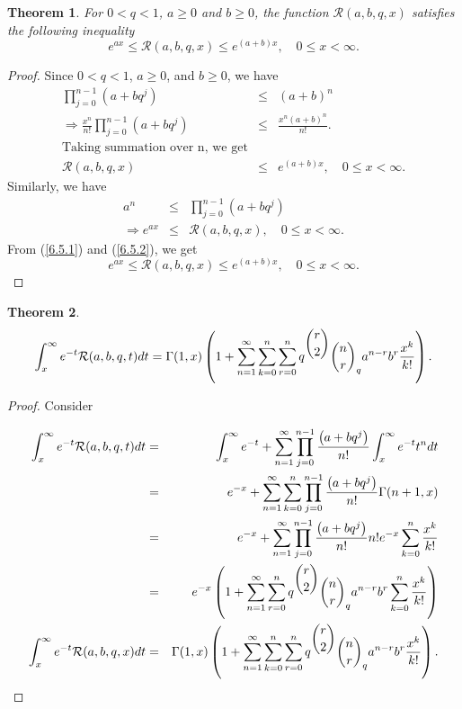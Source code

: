 \documentclass[12pt]{article}
\newtheorem{The}{Theorem}[section]
\numberwithin{equation}{section}
\begin{document}
\begin{The}
For $0<q<1$, $a\ge 0$ and  $b\ge 0$, the function $\mathcal{R}(a,b,q,x)$ satisfies the following inequality
\begin{equation}
 e^{ax}\le \mathcal{R}(a,b,q,x)\le e^{(a+b)x},\quad 0 \le x < \infty.
\end{equation}
\end{The}

\begin{proof}
 Since $0<q<1$, $a\ge 0$, and  $b\ge 0$, we have
\begin{eqnarray}
\prod_{j=0}^{n-1}\left(a+bq^j\right) &\le& (a+b)^n \nonumber\\
\Rightarrow  \frac{x^n}{n!}\prod_{j=0}^{n-1}\left(a+bq^j\right) &\le&  \frac{x^n (a+b)^n}{n!}.\nonumber\\
\textrm{Taking summation over n, we get} \nonumber\\
 \mathcal{R}(a,b,q,x) &\le& e^{(a+b)x},\quad 0 \le x < \infty.\label{6.5.1}
\end{eqnarray}
Similarly, we have
\begin{eqnarray}
a^n &\le& \prod_{j=0}^{n-1}\left(a+bq^j\right)  \nonumber\\
\Rightarrow e^{ax} &\le& \mathcal{R}(a,b,q,x)  ,\quad 0 \le x < \infty.\label{6.5.2}
\end{eqnarray}
From (\ref{6.5.1}) and (\ref{6.5.2}), we get
\begin{equation}
 e^{ax}\le \mathcal{R}(a,b,q,x)\le e^{(a+b)x},\quad 0 \le x < \infty.
\end{equation}
\end{proof}

\begin{The}
\begin{equation}
\int_{x}^{\infty}e^{-t}\mathcal{R}(a,b,q,t)dt = \Gamma (1, x)\left(1+\sum_{n=1}^\infty \sum_{k=0}^n \sum_{r=0}^n q^{\dbinom{r}{2}} \dbinom{n}{r}_q a^{n-r} b^r \frac{x^k}{k!}\right).
\end{equation}
\end{The}


\begin{proof} Consider

\begin{eqnarray*}
\int_{x}^{\infty}e^{-t}\mathcal{R}(a,b,q,t)dt &=& \int_{x}^{\infty}e^{-t} + \sum_{n=1}^\infty  \prod_{j=0}^{n-1}\frac {\left(a+bq^j\right)}{n!} \int_{x}^{\infty}e^{-t}t^n dt\\
&=& e^{-x} + \sum_{n=1}^\infty \sum_{k=0}^n \prod_{j=0}^{n-1}\frac {\left(a+bq^j\right)}{n!} \Gamma(n+1,x)\\
&=& e^{-x} + \sum_{n=1}^\infty  \prod_{j=0}^{n-1}\frac {\left(a+bq^j\right)}{n!} n! e^{-x}\sum_{k=0}^n \frac{x^k}{k!}\\
&=& e^{-x}\left(1 + \sum_{n=1}^\infty  \sum_{r=0}^n q^{\dbinom{r}{2}} \dbinom{n}{r}_q a^{n-r} b^r \sum_{k=0}^n \frac{x^k}{k!}\right)\\
\int_{x}^{\infty}e^{-t}\mathcal{R}(a,b,q,x)dt &=& \Gamma (1, x)\left(1+\sum_{n=1}^\infty \sum_{k=0}^n \sum_{r=0}^n q^{\dbinom{r}{2}} \dbinom{n}{r}_q a^{n-r} b^r \frac{x^k}{k!}\right).
\end{eqnarray*}
\end{proof}
\end{document}
